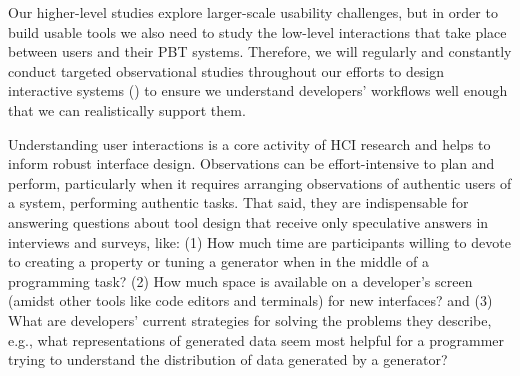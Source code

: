 
%
Our higher-level studies explore larger-scale usability challenges, but in order
to build usable tools we also need to study the low-level interactions that
take place between users and their PBT systems. Therefore, we will regularly and
constantly conduct targeted observational studies throughout our efforts to
design interactive systems ()
to ensure we understand
developers' workflows well enough that we can realistically support them.

Understanding user interactions
is a core activity of HCI research and helps to inform robust interface design.
Observations can be effort-intensive to plan and perform, particularly when it
requires arranging observations of authentic users of a system, performing
authentic tasks. That said, they
are indispensable for answering questions about tool design that receive only
speculative answers in interviews and surveys, like:
(1) How much time
are participants willing to devote to
creating a property or tuning a generator when in the
middle of a programming task?
(2) How much space is available on a developer's
screen (amidst other tools like code editors and terminals) for
new
interfaces? and
(3) What are developers' current strategies for solving the
problems they describe, e.g., what representations of generated data
seem most helpful
for a programmer trying to understand the distribution of data generated by a
generator?

